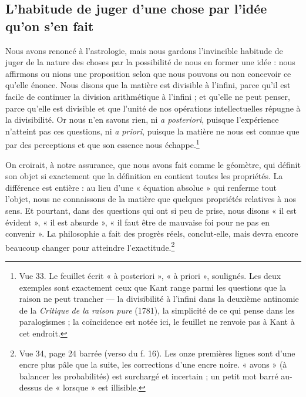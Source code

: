 \documentclass[11pt,a4paper]{article}
\begin{document}
\subsection*{L'habitude de juger d'une chose par l'idée qu'on s'en fait}

Nous avons renoncé à l'astrologie, mais nous gardons l'invincible habitude de
juger de la nature des choses par la possibilité de nous en former une idée :
nous affirmons ou nions une proposition selon que nous pouvons ou non concevoir
ce qu'elle énonce. Nous disons que la matière est divisible à l'infini, parce
qu'il est facile de continuer la division arithmétique à l'infini ; et qu'elle
ne peut penser, parce qu'elle est divisible et que l'unité de nos opérations
intellectuelles répugne à la divisibilité. Or nous n'en savons rien, ni
\emph{a posteriori}, puisque l'expérience n'atteint pas ces questions, ni
\emph{a priori}, puisque la matière ne nous est connue que par des perceptions
et que son essence nous échappe.\footnote{Vue 33. Le feuillet écrit « à
posteriori », « à priori », soulignés. Les deux exemples sont exactement ceux
que Kant range parmi les questions que la raison ne peut trancher — la
divisibilité à l'infini dans la deuxième antinomie de la \emph{Critique de la
raison pure} (1781), la simplicité de ce qui pense dans les paralogismes ; la
coïncidence est notée ici, le feuillet ne renvoie pas à Kant à cet endroit.}

On croirait, à notre assurance, que nous avons fait comme le géomètre, qui
définit son objet si exactement que la définition en contient toutes les
propriétés. La différence est entière : au lieu d'une « équation absolue » qui
renferme tout l'objet, nous ne connaissons de la matière que quelques
propriétés relatives à nos sens. Et pourtant, dans des questions qui ont si peu
de prise, nous disons « il est évident », « il est absurde », « il faut être de
mauvaise foi pour ne pas en convenir ». La philosophie a fait des progrès réels,
conclut-elle, mais devra encore beaucoup changer pour atteindre
l'exactitude.\footnote{Vue 34, page 24 barrée (verso du f. 16). Les onze
premières lignes sont d'une encre plus pâle que la suite, les corrections d'une
encre noire. « avons » (à balancer les probabilités) est surchargé et
incertain ; un petit mot barré au-dessus de « lorsque » est illisible.}
\end{document}
